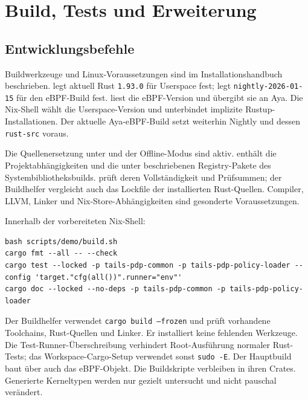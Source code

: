 \documentclass[12pt,a4paper]{article}
\begin{document}
\section{Build, Tests und Erweiterung}
\subsection{Entwicklungsbefehle}
Buildwerkzeuge und Linux-Voraussetzungen sind im Installationshandbuch beschrieben.
 legt aktuell Rust \texttt{1.93.0} für Userspace fest;
 legt \texttt{nightly-2026-01-15} für den eBPF-Build fest.
 liest die eBPF-Version und übergibt sie an Aya.
Die Nix-Shell wählt die Userspace-Version und unterbindet implizite Rustup-Installationen.
Der aktuelle Aya-eBPF-Build setzt weiterhin Nightly und dessen \texttt{rust-src} voraus.

Die Quellenersetzung unter  und der Offline-Modus sind aktiv.
 enthält die Projektabhängigkeiten und die unter
 beschriebenen Registry-Pakete des
Systembibliotheksbuilds.  prüft deren Vollständigkeit
und Prüfsummen; der Buildhelfer vergleicht auch das Lockfile der installierten Rust-Quellen.
Compiler, LLVM, Linker und Nix-Store-Abhängigkeiten sind gesonderte Voraussetzungen.

Innerhalb der vorbereiteten Nix-Shell:
\begin{lstlisting}
bash scripts/demo/build.sh
cargo fmt --all -- --check
cargo test --locked -p tails-pdp-common -p tails-pdp-policy-loader --config 'target."cfg(all())".runner="env"'
cargo doc --locked --no-deps -p tails-pdp-common -p tails-pdp-policy-loader
\end{lstlisting}
Der Buildhelfer verwendet \texttt{cargo build --frozen} und prüft vorhandene
Toolchains, Rust-Quellen und Linker. Er installiert keine fehlenden Werkzeuge.
Die Test-Runner-Überschreibung verhindert Root-Ausführung normaler Rust-Tests;
das Workspace-Cargo-Setup verwendet sonst \texttt{sudo -E}.
Der Hauptbuild baut über  auch das eBPF-Objekt.
Die Buildskripte verbleiben in ihren Crates. Generierte Kerneltypen werden nur
gezielt untersucht und nicht pauschal verändert.
\end{document}
